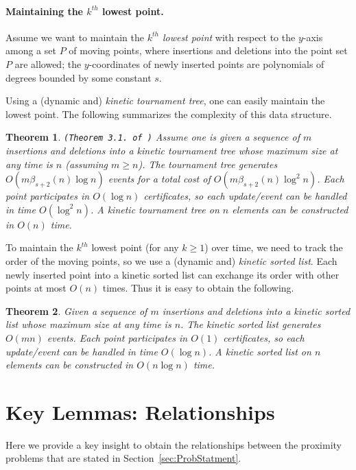 \documentclass[preprint,12pt]{elsarticle}
\newtheorem{theorem}{Theorem}[section]
\begin{document}
\paragraph{Maintaining the $k^{th}$ lowest point.} Assume we want to maintain the \textit{$k^{th}$ lowest point} with respect to the $y$-axis among a set $P$ of moving points, where insertions and deletions into the point set $P$ are allowed; the $y$-coordinates of newly inserted points are polynomials of degrees bounded by some constant $s$. 

Using a (dynamic and) \textit{kinetic tournament tree}, one can easily maintain the lowest point. The following summarizes the complexity of this data structure.

\begin{theorem}\label{the:KineticTT} {\tt (Theorem 3.1. of \cite{Agarwal:2008:KDD:1435375.1435379})}
Assume one is given a sequence of $m$ insertions and deletions into a kinetic tournament tree whose maximum size at any time is $n$ (assuming $m\geq n$). The tournament tree generates $O(m\beta_{s+2}(n)\log n)$ events for a total cost of $O(m\beta_{s+2}(n)\log^2 n)$. Each point participates in $O(\log n)$ certificates, so each update/event can be handled in time $O(\log^2 n)$. A kinetic tournament tree on $n$ elements can be constructed in $O(n)$ time.  
\end{theorem}

To maintain the $k^{th}$ lowest point (for any $k\geq 1$) over time, we need to track the order of the moving points, so we use a (dynamic and) \textit{kinetic sorted list}. Each newly inserted point into a kinetic sorted list can exchange its order with other points at most $O(n)$ times.  Thus it is easy to obtain the following.

\begin{theorem}\label{the:KineticSL}
Given a sequence of $m$ insertions and deletions into a kinetic sorted list whose maximum size at any time is $n$. The kinetic sorted list generates $O(mn)$ events. Each point participates in $O(1)$ certificates, so each update/event can be handled in time $O(\log n)$. A kinetic sorted list on $n$ elements can be constructed in $O(n\log n)$ time.  
\end{theorem}

\section{Key Lemmas: Relationships}\label{sec:Relationship}
Here we provide a key insight to obtain the relationships between the proximity problems that are stated in Section~\ref{sec:ProbStatment}.
\end{document}
